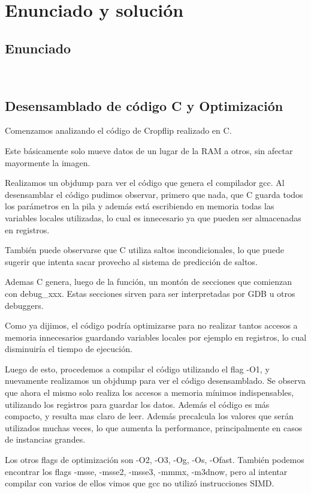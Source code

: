 \documentclass[a4paper]{article}
\begin{document}
\section{Enunciado y solución} 

\subsection{Enunciado}


\
\newpage

\subsection{Desensamblado de código C y Optimización}
Comenzamos analizando el código de Cropflip realizado en C.

Este básicamente solo mueve datos de un lugar de la RAM a otros, sin afectar mayormente la imagen.

Realizamos un objdump para ver el código que genera el compilador gcc. Al desensamblar el código pudimos observar, primero que nada, que C guarda todos los parámetros en la pila y además está escribiendo en memoria todas las variables locales utilizadas, lo cual es innecesario ya que pueden ser almacenadas en registros.

También puede observarse que C utiliza saltos incondicionales, lo que puede sugerir que intenta sacar provecho al sistema de predicción de saltos.

Ademas C genera, luego de la función, un montón de secciones que comienzan con debug_xxx. Estas secciones sirven para ser interpretadas por GDB u otros debuggers.

Como ya dijimos, el código podría optimizarse para no realizar tantos accesos a memoria innecesarios guardando variables locales por ejemplo en registros, lo cual disminuiría el tiempo de ejecución.

Luego de esto, procedemos a compilar el código utilizando el flag -O1, y nuevamente realizamos un objdump para ver el código desensamblado. Se observa que ahora el mismo solo realiza los accesos a memoria mínimos indispensables, utilizando los registros para guardar los datos. Además el código es más compacto, y resulta mas claro de leer. Además precalcula los valores que serán utilizados muchas veces, lo que aumenta la performance, principalmente en casos de instancias grandes.

Los otros flags de optimización son -O2, -O3, -Og, -Os, -Ofast. También podemos encontrar los flags -msse, -msse2, -msse3, -mmmx, -m3dnow, pero al intentar compilar con varios de ellos vimos que gcc no utilizó instrucciones SIMD.
\end{document}
